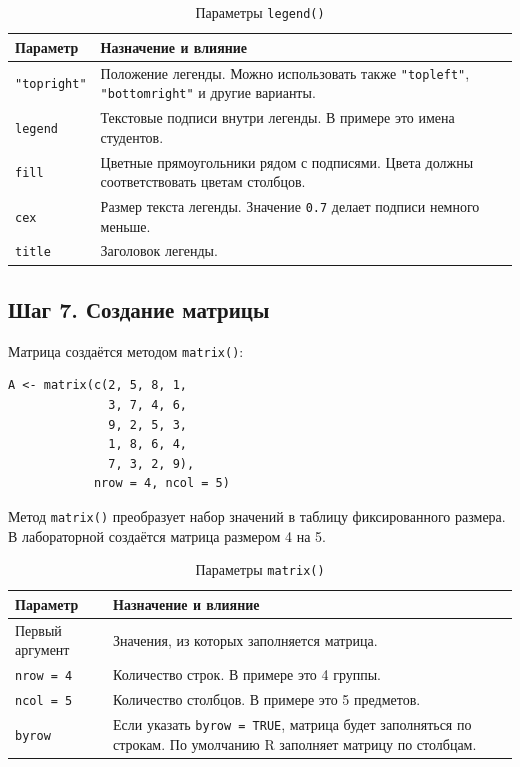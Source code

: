 \documentclass[14pt,a4paper]{extarticle}
\begin{document}
\begin{table}[H]
\caption{Параметры \texttt{legend()}}
\begin{tabularx}{\textwidth}{|l|Y|}
\hline
\textbf{Параметр} & \textbf{Назначение и влияние} \\
\hline
\texttt{"topright"} & Положение легенды. Можно использовать также \texttt{"topleft"}, \texttt{"bottomright"} и другие варианты. \\
\hline
\texttt{legend} & Текстовые подписи внутри легенды. В примере это имена студентов. \\
\hline
\texttt{fill} & Цветные прямоугольники рядом с подписями. Цвета должны соответствовать цветам столбцов. \\
\hline
\texttt{cex} & Размер текста легенды. Значение \texttt{0.7} делает подписи немного меньше. \\
\hline
\texttt{title} & Заголовок легенды. \\
\hline
\end{tabularx}
\end{table}

\subsection{Шаг 7. Создание матрицы}

Матрица создаётся методом \texttt{matrix()}:

\begin{lstlisting}
A <- matrix(c(2, 5, 8, 1,
              3, 7, 4, 6,
              9, 2, 5, 3,
              1, 8, 6, 4,
              7, 3, 2, 9),
            nrow = 4, ncol = 5)
\end{lstlisting}

Метод \texttt{matrix()} преобразует набор значений в таблицу фиксированного размера. В лабораторной создаётся матрица размером 4 на 5.

\begin{table}[H]
\caption{Параметры \texttt{matrix()}}
\begin{tabularx}{\textwidth}{|l|Y|}
\hline
\textbf{Параметр} & \textbf{Назначение и влияние} \\
\hline
Первый аргумент & Значения, из которых заполняется матрица. \\
\hline
\texttt{nrow = 4} & Количество строк. В примере это 4 группы. \\
\hline
\texttt{ncol = 5} & Количество столбцов. В примере это 5 предметов. \\
\hline
\texttt{byrow} & Если указать \texttt{byrow = TRUE}, матрица будет заполняться по строкам. По умолчанию R заполняет матрицу по столбцам. \\
\hline
\end{tabularx}
\end{table}
\end{document}
